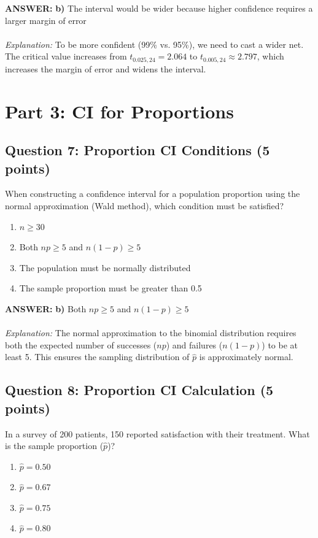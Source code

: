 \documentclass[11pt]{article}
\newcommand{\answer}[1]{\par\vspace{0.3em}\colorbox{green!10}{\parbox{\dimexpr\textwidth-2\fboxsep}{\textbf{ANSWER:} #1}}\vspace{0.3em}\par}
\begin{document}
\answer{\textbf{b)} The interval would be wider because higher confidence requires a larger margin of error \\ \\
\textit{Explanation:} To be more confident (99\% vs. 95\%), we need to cast a wider net. The critical value increases from $t_{0.025, 24} = 2.064$ to $t_{0.005, 24} \approx 2.797$, which increases the margin of error and widens the interval.}

\section*{Part 3: CI for Proportions}

\subsection*{Question 7: Proportion CI Conditions (5 points)}

When constructing a confidence interval for a population proportion using the normal approximation (Wald method), which condition must be satisfied?

\begin{enumerate}[label=\alph*)]
\item $n \geq 30$
\item Both $np \geq 5$ and $n(1-p) \geq 5$
\item The population must be normally distributed
\item The sample proportion must be greater than 0.5
\end{enumerate}

\answer{\textbf{b)} Both $np \geq 5$ and $n(1-p) \geq 5$ \\ \\
\textit{Explanation:} The normal approximation to the binomial distribution requires both the expected number of successes ($np$) and failures ($n(1-p)$) to be at least 5. This ensures the sampling distribution of $\hat{p}$ is approximately normal.}

\subsection*{Question 8: Proportion CI Calculation (5 points)}

In a survey of 200 patients, 150 reported satisfaction with their treatment. What is the sample proportion ($\hat{p}$)?

\begin{enumerate}[label=\alph*)]
\item $\hat{p} = 0.50$
\item $\hat{p} = 0.67$
\item $\hat{p} = 0.75$
\item $\hat{p} = 0.80$
\end{enumerate}
\end{document}
